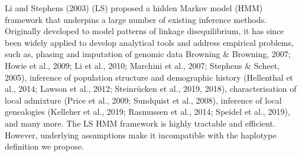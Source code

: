 \documentclass[twocolumn]{bmcart}%
\begin{document}
\begin{strip}
\begin{tcolorbox}[colback=white,colframe=blue!50!black,title= Box 3: Application and limits of Li and Stephens Model ]
  \begin{multicols}{2}
\small{Li and Stephens (2003) (LS) proposed a hidden Markov model (HMM) framework that underpins a large number of existing inference methods. Originally developed to model patterns of linkage disequilibrium, it has since been widely applied to develop analytical tools and address empirical problems, such as, phasing and imputation of genomic data  Browning \& Browning, 2007; Howie et al., 2009; Li et al., 2010; Marchini et al., 2007; Stephens \& Scheet, 2005), inference of population structure and demographic history (Hellenthal et al., 2014; Lawson et al., 2012; Steinrücken et al., 2019, 2018), characterisation of local admixture (Price et al., 2009; Sundquist et al., 2008), inference of local genealogies (Kelleher et al., 2019; Rasmussen et al., 2014; Speidel et al., 2019), and many more. The LS HMM framework is highly tractable and efficient. However, underlying assumptions make it incompatible with the haplotype definition we propose.\\

}
\end{multicols}
\end{tcolorbox}
\end{strip}
\end{document}
